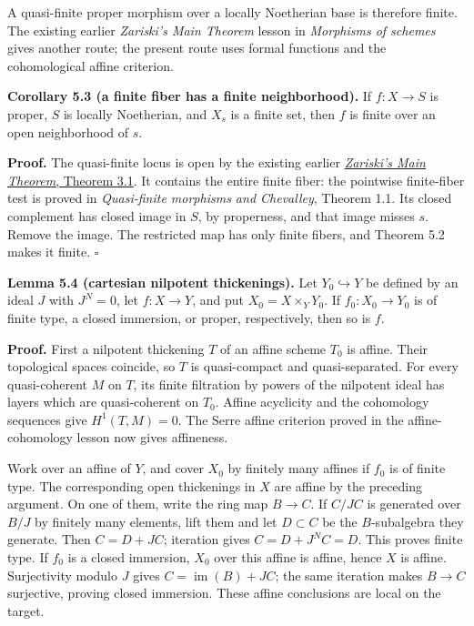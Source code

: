 \documentclass[11pt]{article}
\begin{document}
A quasi-finite proper morphism over a locally Noetherian base is
therefore finite. The existing earlier \emph{Zariski's Main Theorem}
lesson in \emph{Morphisms of schemes} gives another route; the present
route uses formal functions and the cohomological affine criterion.

\textbf{Corollary 5.3 (a finite fiber has a finite neighborhood).} If
\(f:X\to S\) is proper, \(S\) is locally Noetherian, and \(X_s\) is a
finite set, then \(f\) is finite over an open neighborhood of \(s\).

\textbf{Proof.} The quasi-finite locus is open by the existing earlier
\href{../AG-MO/AG-MO-12.html\#3-from-local-equalities-to-finite-affine-completions}{\emph{Zariski's
Main Theorem}, Theorem 3.1}. It contains the entire finite fiber: the
pointwise finite-fiber test is proved in \emph{Quasi-finite morphisms
and Chevalley}, Theorem 1.1. Its closed complement has closed image in
\(S\), by properness, and that image misses \(s\). Remove the image. The
restricted map has only finite fibers, and Theorem 5.2 makes it finite.
\(\square\)

\textbf{Lemma 5.4 (cartesian nilpotent thickenings).} Let
\(Y_0\hookrightarrow Y\) be defined by an ideal \(J\) with \(J^N=0\),
let \(f:X\to Y\), and put \(X_0=X\times_Y Y_0\). If \(f_0:X_0\to Y_0\)
is of finite type, a closed immersion, or proper, respectively, then so
is \(f\).

\textbf{Proof.} First a nilpotent thickening \(T\) of an affine scheme
\(T_0\) is affine. Their topological spaces coincide, so \(T\) is
quasi-compact and quasi-separated. For every quasi-coherent \(M\) on
\(T\), its finite filtration by powers of the nilpotent ideal has layers
which are quasi-coherent on \(T_0\). Affine acyclicity and the
cohomology sequences give \(H^1(T,M)=0\). The Serre affine criterion
proved in the affine-cohomology lesson now gives affineness.

Work over an affine of \(Y\), and cover \(X_0\) by finitely many affines
if \(f_0\) is of finite type. The corresponding open thickenings in
\(X\) are affine by the preceding argument. On one of them, write the
ring map \(B\to C\). If \(C/JC\) is generated over \(B/J\) by finitely
many elements, lift them and let \(D\subset C\) be the \(B\)-subalgebra
they generate. Then \(C=D+JC\); iteration gives \(C=D+J^NC=D\). This
proves finite type. If \(f_0\) is a closed immersion, \(X_0\) over this
affine is affine, hence \(X\) is affine. Surjectivity modulo \(J\) gives
\(C=\operatorname{im}(B)+JC\); the same iteration makes \(B\to C\)
surjective, proving closed immersion. These affine conclusions are local
on the target.
\end{document}

